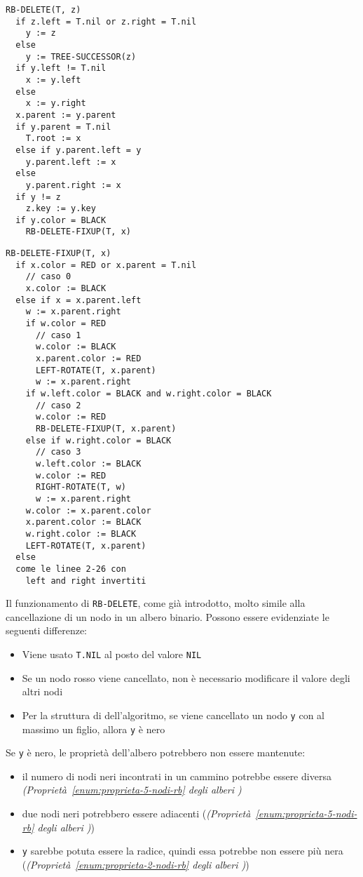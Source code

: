 \documentclass[italian, 10pt]{article}
\begin{document}
\begin{lstlisting}[float, style=pseudocode, caption={Cancellazione in un RB}, label={lst:cancellazione-nodo-rb}]
RB-DELETE(T, z)
  if z.left = T.nil or z.right = T.nil
    y := z
  else
    y := TREE-SUCCESSOR(z)
  if y.left != T.nil
    x := y.left
  else
    x := y.right
  x.parent := y.parent
  if y.parent = T.nil
    T.root := x
  else if y.parent.left = y
    y.parent.left := x
  else
    y.parent.right := x
  if y != z
    z.key := y.key
  if y.color = BLACK
    RB-DELETE-FIXUP(T, x)
\end{lstlisting}
\begin{lstlisting}[float, style=pseudocode, caption={Fixup dopo cancellazione}, label={lst:rb-delete-fixup}]
RB-DELETE-FIXUP(T, x)
  if x.color = RED or x.parent = T.nil
    // caso 0
    x.color := BLACK
  else if x = x.parent.left
    w := x.parent.right
    if w.color = RED
      // caso 1
      w.color := BLACK
      x.parent.color := RED
      LEFT-ROTATE(T, x.parent)
      w := x.parent.right
    if w.left.color = BLACK and w.right.color = BLACK
      // caso 2
      w.color := RED
      RB-DELETE-FIXUP(T, x.parent)
    else if w.right.color = BLACK
      // caso 3
      w.left.color := BLACK
      w.color := RED
      RIGHT-ROTATE(T, w)
      w := x.parent.right
    w.color := x.parent.color
    x.parent.color := BLACK
    w.right.color := BLACK
    LEFT-ROTATE(T, x.parent)
  else
  come le linee 2-26 con
    left and right invertiti
  \end{lstlisting}

\bigskip
Il funzionamento di \texttt{RB-DELETE}, come già introdotto, molto simile alla cancellazione di un nodo in un albero binario.
Possono essere evidenziate le seguenti differenze:

\begin{itemize}
  \item Viene usato \texttt{T.NIL} al posto del valore \texttt{NIL}
  \item Se un nodo rosso viene cancellato, non è necessario modificare il valore degli altri nodi
  \item Per la struttura di dell'algoritmo, se viene cancellato un nodo \texttt{y} con al massimo un figlio, allora \texttt{y} è nero
\end{itemize}

Se \texttt{y} è nero, le proprietà dell'albero \RB potrebbero non essere mantenute:

\begin{itemize}
  \item il numero di nodi neri incontrati in un cammino potrebbe essere diversa \textit{(Proprietà~\ref{enum:proprieta-5-nodi-rb} degli alberi \RB)}
  \item due nodi neri potrebbero essere adiacenti (\textit{(Proprietà~\ref{enum:proprieta-5-nodi-rb} degli alberi \RB)})
  \item \texttt{y} sarebbe potuta essere la radice, quindi essa potrebbe non essere più nera (\textit{(Proprietà~\ref{enum:proprieta-2-nodi-rb} degli alberi \RB)})
\end{itemize}
\end{document}
